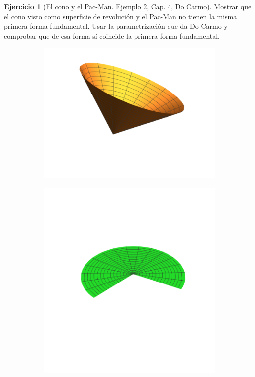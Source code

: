 \documentclass[spanish]{book}
\theoremstyle{definition}
\newtheorem*{ejer}{Ejercicio}
\begin{document}
\begin{ejer}[El cono y el Pac-Man. Ejemplo 2, Cap. 4, Do Carmo] Mostrar que el cono visto como superficie de revolución y el Pac-Man no tienen la misma primera forma fundamental. Usar la parametrización que da Do Carmo y comprobar que de esa forma sí coincide la primera forma fundamental.
		\vspace{-2cm}
		\begin{figure}[H]
		\begin{subfigure}{0.5\textwidth}
			\centering
			\includegraphics[width=\linewidth]{sup15}
		\end{subfigure}	\hspace{-1cm}
		\begin{subfigure}{.5\textwidth}
			\centering
			\includegraphics[width=\linewidth]{sup16}

\end{subfigure}
\end{figure}
\end{ejer}
\end{document}
